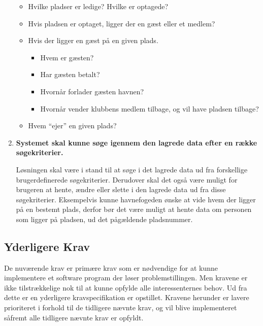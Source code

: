 \begin{enumerate}
  \begin{itemize}
  \item Hvilke pladser er ledige? Hvilke er optagede?
  \item Hvis pladsen er optaget, ligger der en gæst eller et medlem?
  \item Hvis der ligger en gæst på en given plads.
    \begin{itemize}
      \item Hvem er gæsten?
      \item Har gæsten betalt?
      \item Hvornår forlader gæsten havnen?
      \item Hvornår vender klubbens medlem tilbage, og vil have pladsen tilbage?
    \end{itemize}
  \item Hvem \enquote{ejer} en given plads?
  \end{itemize}

\item \label{itm:soege} \textbf{Systemet skal kunne søge igennem den lagrede data efter en række søgekriterier.}

  Løsningen skal være i stand til at søge i det lagrede data ud fra forskellige brugerdefinerede søgekriterier. Derudover skal det også være muligt for brugeren at hente, ændre eller slette i den lagrede data ud fra disse søgekriterier. Eksempelvis kunne havnefogeden ønske at vide hvem der ligger på en bestemt plads, derfor bør det være muligt at hente data om personen som ligger på pladsen, ud det pågældende pladsnummer.

\end{enumerate}


\subsection{Yderligere Krav}
De nuværende krav er primære krav som er nødvendige for at kunne implementere et software program der løser problemstillingen. Men kravene er ikke tilstrækkelige nok til at kunne opfylde alle interessenternes behov. Ud fra dette er en yderligere kravspecifikation er opstillet. Kravene herunder er lavere prioriteret i forhold til de tidligere nævnte krav, og vil blive implementeret såfremt alle tidligere nævnte krav er opfyldt.

